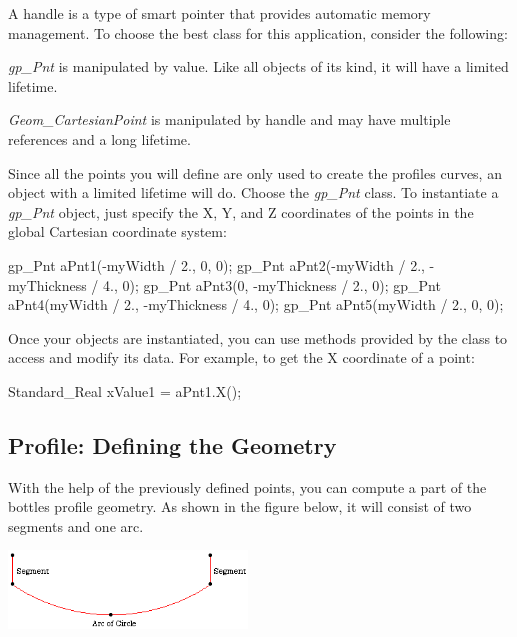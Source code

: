 A handle is a type of smart pointer that provides automatic memory management. To choose the best class for this application, consider the following\+:


\begin{DoxyItemize}
\item {\itshape gp\+\_\+\+Pnt} is manipulated by value. Like all objects of its kind, it will have a limited lifetime.
\item {\itshape Geom\+\_\+\+Cartesian\+Point} is manipulated by handle and may have multiple references and a long lifetime.
\end{DoxyItemize}

Since all the points you will define are only used to create the profile\textquotesingle{}s curves, an object with a limited lifetime will do. Choose the {\itshape gp\+\_\+\+Pnt} class. To instantiate a {\itshape gp\+\_\+\+Pnt} object, just specify the X, Y, and Z coordinates of the points in the global Cartesian coordinate system\+:


\begin{DoxyCode}
gp\_Pnt aPnt1(-myWidth / 2., 0, 0);
gp\_Pnt aPnt2(-myWidth / 2., -myThickness / 4., 0);
gp\_Pnt aPnt3(0, -myThickness / 2., 0);
gp\_Pnt aPnt4(myWidth / 2., -myThickness / 4., 0);
gp\_Pnt aPnt5(myWidth / 2., 0, 0);
\end{DoxyCode}


Once your objects are instantiated, you can use methods provided by the class to access and modify its data. For example, to get the X coordinate of a point\+:


\begin{DoxyCode}
Standard\_Real xValue1 = aPnt1.X();
\end{DoxyCode}
\hypertarget{occt__tutorial_OCCT_TUTORIAL_SUB2_2}{}\subsection{Profile\+: Defining the Geometry}\label{occt__tutorial_OCCT_TUTORIAL_SUB2_2}
With the help of the previously defined points, you can compute a part of the bottle\textquotesingle{}s profile geometry. As shown in the figure below, it will consist of two segments and one arc.


\begin{DoxyImageNoCaption}
\begin{center}
   \mbox{\includegraphics[width=240]{tutorial_image004.png}}
\end{center}
\end{DoxyImageNoCaption}


